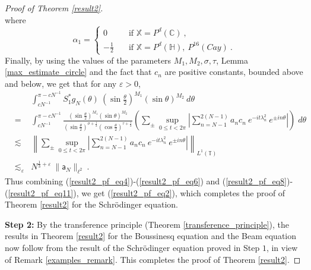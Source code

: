 \documentclass[12pt]{amsart}
\theoremstyle{definition}
\newcommand{\C}{\mathbb C}%
\newcommand{\T}{\mathbb T}%
\newcommand{\X}{\mathbb X}%
\newcommand{\Hb}{\mathbb H}%
\newcommand{\sa}{\textsf{a}}
\numberwithin{equation}{section}
\begin{document}
\begin{proof}[Proof of Theorem \ref{result2}]
\begin{equation}
\end{equation}
where 
\begin{equation} \label{result2_pf_eq9}
\alpha_1 = \begin{cases}
0\:\:\:&\text{ if } \X=P^d(\C)\:,\\
-\frac{1}{2}\:\:\:&\text{ if } \X=P^d(\Hb),\:P^{16}(Cay)\:.
\end{cases}
\end{equation}
Finally, by using the values of the parameters $M_1,M_2,\sigma,\tau$, Lemma \ref{max_estimate_circle} and the fact that $c_n$ are positive constants, bounded above and below, we get that for any $\varepsilon>0$,
\begin{eqnarray} \label{result2_pf_eq11}
&&\int_{cN^{-1}}^{\pi-cN^{-1}} S^*_1g_N(\theta)\:{\left(\sin \frac{\theta}{2}\right)}^{M_1} {(\sin \theta)}^{M_2}\:d\theta \nonumber\\
& = & \int_{cN^{-1}}^{\pi-cN^{-1}} \frac{{\left(\sin \frac{\theta}{2}\right)}^{M_1} {(\sin \theta)}^{M_2}}{\left(\sin\frac{\theta}{2}\right)^{\sigma+\frac{1}{2}}\left(\cos\frac{\theta}{2}\right)^{\tau+\frac{1}{2}}}\left(\sum_{\pm}\sup_{0\le t<2\pi} \left|\sum_{n=N-1}^{2(N-1)} a_nc_n\:e^{-it\lambda^2_n}\:e^{\pm in\theta} \right|\right)\;d\theta \nonumber\\
&\lesssim & \left\|\sum_{\pm}\sup_{0\le t<2\pi} \left|\sum_{n=N-1}^{2(N-1)} a_nc_n\:e^{-it\lambda^2_n}\:e^{\pm in\theta} \right|\right\|_{L^1(\T)} \nonumber\\
&\lesssim_\varepsilon & N^{\frac{1}{3}+\varepsilon}\:\|\sa_N\|_{\ell^2}\:.
\end{eqnarray}
Thus combining (\ref{result2_pf_eq4})-(\ref{result2_pf_eq6}) and (\ref{result2_pf_eq8})-(\ref{result2_pf_eq11}), we get (\ref{result2_pf_eq2}), which completes the proof of Theorem \ref{result2} for the Schr\"odinger equation.

\medskip

{\bf Step 2:} By the transference principle (Theorem \ref{transference_principle}), the results in Theorem \ref{result2} for the Boussinesq equation and the Beam equation now follow from the result of the Schr\"odinger equation proved in Step $1$, in view of Remark \ref{examples_remark}. This completes the proof of Theorem \ref{result2}.
\end{proof}
\end{document}
